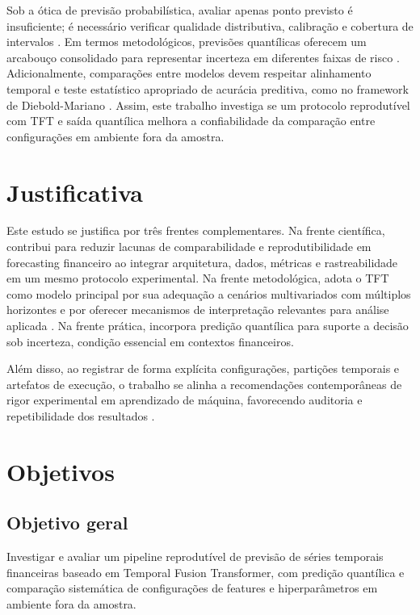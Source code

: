 Sob a ótica de previsão probabilística, avaliar apenas ponto previsto é insuficiente; é necessário verificar qualidade distributiva, calibração e cobertura de intervalos \cite{GNEITING2007}. Em termos metodológicos, previsões quantílicas oferecem um arcabouço consolidado para representar incerteza em diferentes faixas de risco \cite{KOENKERBASSETT1978}. Adicionalmente, comparações entre modelos devem respeitar alinhamento temporal e teste estatístico apropriado de acurácia preditiva, como no framework de Diebold-Mariano \cite{DIEBOLDMARIANO1995}. Assim, este trabalho investiga se um protocolo reprodutível com TFT e saída quantílica melhora a confiabilidade da comparação entre configurações em ambiente fora da amostra.

\section{Justificativa}
Este estudo se justifica por três frentes complementares. Na frente científica, contribui para reduzir lacunas de comparabilidade e reprodutibilidade em forecasting financeiro ao integrar arquitetura, dados, métricas e rastreabilidade em um mesmo protocolo experimental. Na frente metodológica, adota o TFT como modelo principal por sua adequação a cenários multivariados com múltiplos horizontes e por oferecer mecanismos de interpretação relevantes para análise aplicada \cite{LIMETAL2021TFT}. Na frente prática, incorpora predição quantílica para suporte a decisão sob incerteza, condição essencial em contextos financeiros.

Além disso, ao registrar de forma explícita configurações, partições temporais e artefatos de execução, o trabalho se alinha a recomendações contemporâneas de rigor experimental em aprendizado de máquina, favorecendo auditoria e repetibilidade dos resultados \cite{PINEAU2021REPRODUCIBILITY}.

\section{Objetivos}
\subsection{Objetivo geral}
Investigar e avaliar um pipeline reprodutível de previsão de séries temporais financeiras baseado em Temporal Fusion Transformer, com predição quantílica e comparação sistemática de configurações de features e hiperparâmetros em ambiente fora da amostra.

